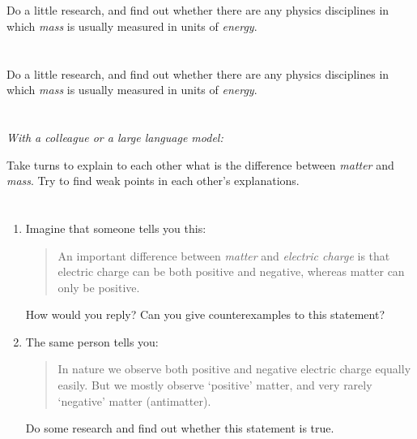 \documentclass[a4paper,12pt,%
onecolumn,oneside,%
british%
]{memoir}
\renewcommand*{\|}[1][]{\nonscript\:#1\vert\nonscript\:\mathopen{}}
\begin{document}
\section{}
\label{sec:energy_meas_mass}

Do a little research, and find out whether there are any physics disciplines in which \emph{mass} is usually measured in units of \emph{energy}.

\section{}
\label{sec:energy_meas_mass}

Do a little research, and find out whether there are any physics disciplines in which \emph{mass} is usually measured in units of \emph{energy}.


\section{}
\label{sec:diff_mass_matter}

\emph{With a colleague or a large language model:}

\smallskip

Take turns to explain to each other what is the difference between \emph{matter} and \emph{mass}. Try to find weak points in each other's explanations.


\section{}
\label{sec:neg_matter}

\begin{enumerate}[exerc]
\item Imagine that someone tells you this:
  \begin{quote}
    An important difference between \emph{matter} and \emph{electric charge} is that electric charge can be both positive and negative, whereas matter can only be positive.
  \end{quote}
  How would you reply? Can you give counterexamples to this statement?

\item The same person tells you:
  \begin{quote}
    In nature we observe both positive and negative electric charge equally easily. But we mostly observe \enquote*{positive} matter, and very rarely \enquote*{negative} matter (antimatter).
  \end{quote}
  Do some research and find out whether this statement is true.
\end{enumerate}
\end{document}

